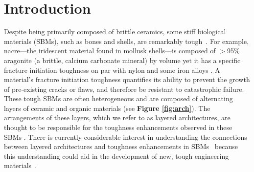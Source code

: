\documentclass[12pt,onecolumn]{article}
\begin{document}
\section*{Introduction}
Despite being primarily composed of brittle ceramics, some stiff biological materials (SBMs), such as bones and shells, are remarkably tough~\cite{ritchie2011conflicts, wegst2015bioinspired, wang2001, gao2017mass}. For example, nacre---the iridescent material found in mollusk shells---is composed of $>$95\% aragonite (a brittle, calcium carbonate mineral) by volume yet it has a specific fracture initiation toughness on par with nylon and some iron alloys \cite{gao2017mass}. A material's fracture initiation toughness quantifies its ability to prevent the growth of pre-existing cracks or flaws, and therefore be resistant to catastrophic failure. These tough SBMs are often heterogeneous and are composed of alternating layers of ceramic and organic materials (see {\bf Figure \ref{fig:arch}}). The arrangements of these layers, which we refer to as layered architectures, are thought to be responsible for the toughness enhancements observed in these SBMs \cite{mayer2011new}. There is currently considerable interest in understanding the connections between layered architectures and toughness enhancements in SBMs~\cite{mayer2011new,mayer2005rigid,rabiei2010failure, kolednik2011bioinspired} because this understanding could aid in the development of new, tough engineering materials~\cite{munch2008tough,karambelas2013strombus,gao2017mass}.
%
\end{document}
